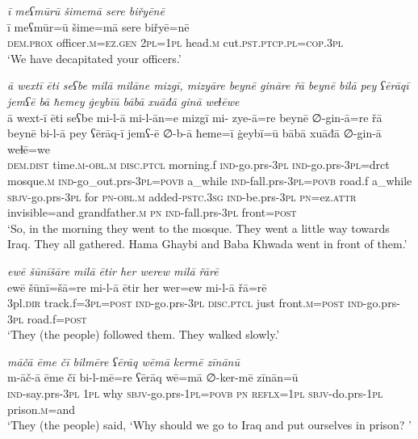 \ea \label{BP.96}
\textit{ī meʕmūrū šimemā sere biřyēnē} \\ 
\gll ī meʕmūr=ū šime=mā sere biřyē=nē \\ 
 \textsc{dem.prox} officer\textsc{.m}\textsc{=ez.gen} \textsc{2pl}\textsc{=\textsc{1pl}} head\textsc{.m} cut\textsc{.pst}\textsc{.ptcp}\textsc{.pl}\textsc{=cop}\textsc{.3pl} \\ 
\glt `We have decapitated your officers.'
\z 
 
\ea \label{BP.98}
\textit{ā wextī ēti seʕbe milā milāne mizgī, mizyāre beynē gināre řā beynē bilā pey ʕērāqī jemʕē bā ħemey ġeybīū bābā xuāđā ginā weɫēwe} \\ 
\gll ā wext-ī ēti seʕbe mi-l-ā mi-l-ān=e mizgī mi- zye-ā=re beynē ∅-gin-ā=re řā beynē bi-l-ā pey ʕērāq-ī jemʕ-ē ∅-b-ā ħeme=ī ġeybī=ū bābā xuāđā ∅-gin-ā weɫē=we \\ 
 \textsc{dem.dist} time\textsc{.m}\textsc{-obl}\textsc{.m} \textsc{disc.ptcl} morning.f \textsc{ind-}go.prs\textsc{-3pl} \textsc{ind-}go.prs\textsc{-3pl}=drct mosque\textsc{.m} \textsc{ind-}go\_out.prs\textsc{-3pl}\textsc{=\textsc{povb}} a\_while \textsc{ind-}fall.prs\textsc{-3pl}\textsc{=\textsc{povb}} road.f a\_while \textsc{sbjv-}go.prs\textsc{-3pl} for \textsc{pn}\textsc{-obl}\textsc{.m} added\textsc{-pstc}\textsc{.3sg} \textsc{ind-}be.prs\textsc{-3pl} \textsc{pn}=ez.\textsc{attr} invisible=and grandfather\textsc{.m} \textsc{pn} \textsc{ind-}fall.prs\textsc{-3pl} front\textsc{=\textsc{post}} \\ 
\glt `So, in the morning they went to the mosque. They went a little way towards Iraq. They all gathered. Hama Ghaybi and Baba Khwada went in front of them.'
\z 
 
\ea \label{BP.99}
\textit{ewē šūnīšāre milā ētir her werew milā řārē} \\ 
\gll ewē šūnī=šā=re mi-l-ā ētir her wer=ew mi-l-ā řā=rē \\ 
 3pl\textsc{.dir} track.f\textsc{=3pl}\textsc{=\textsc{post}} \textsc{ind-}go.prs\textsc{-3pl} \textsc{disc.ptcl} just front\textsc{.m}\textsc{=\textsc{post}} \textsc{ind-}go.prs\textsc{-3pl} road.f\textsc{=\textsc{post}} \\ 
\glt `They (the people) followed them. They walked slowly.'
\z 
 
\ea \label{BP.101}
\textit{māčā ēme čī bilmēre ʕērāq wēmā kermē zīnānū} \\ 
\gll m-āč-ā ēme čī bi-l-mē=re ʕērāq wē=mā ∅-ker-mē zīnān=ū \\ 
 \textsc{ind-}say.prs\textsc{-3pl} \textsc{1pl} why \textsc{sbjv-}go.prs\textsc{-\textsc{1pl}}\textsc{=\textsc{povb}} \textsc{pn} \textsc{reflx}\textsc{=\textsc{1pl}} \textsc{sbjv-}do.prs\textsc{-\textsc{1pl}} prison\textsc{.m}=and \\ 
\glt `They (the people) said, ‘Why should we go to Iraq and put ourselves in   prison? '
\z 
 
